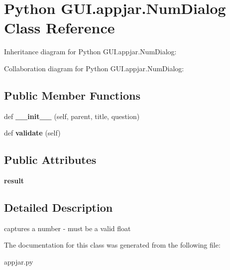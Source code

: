 \hypertarget{class_python_01_g_u_i_1_1appjar_1_1_num_dialog}{}\section{Python G\+U\+I.\+appjar.\+Num\+Dialog Class Reference}
\label{class_python_01_g_u_i_1_1appjar_1_1_num_dialog}


Inheritance diagram for Python G\+U\+I.\+appjar.\+Num\+Dialog\+:


Collaboration diagram for Python G\+U\+I.\+appjar.\+Num\+Dialog\+:
\subsection*{Public Member Functions}
\begin{DoxyCompactItemize}
\item 
\mbox{\label{class_python_01_g_u_i_1_1appjar_1_1_num_dialog_a9d7fdfc1ee2ccb5666cf5bbc494bc944}} 
def {\bfseries \+\_\+\+\_\+init\+\_\+\+\_\+} (self, parent, title, question)
\item 
\mbox{\label{class_python_01_g_u_i_1_1appjar_1_1_num_dialog_a351b65add1660023dcc4f13550711be0}} 
def {\bfseries validate} (self)
\end{DoxyCompactItemize}
\subsection*{Public Attributes}
\begin{DoxyCompactItemize}
\item 
\mbox{\label{class_python_01_g_u_i_1_1appjar_1_1_num_dialog_aa4ac6e9cc374268e8630ca1d0d31f0f3}} 
{\bfseries result}
\end{DoxyCompactItemize}


\subsection{Detailed Description}
\begin{DoxyVerb}captures a number - must be a valid float \end{DoxyVerb}
 

The documentation for this class was generated from the following file\+:\begin{DoxyCompactItemize}
\item 
appjar.\+py\end{DoxyCompactItemize}
